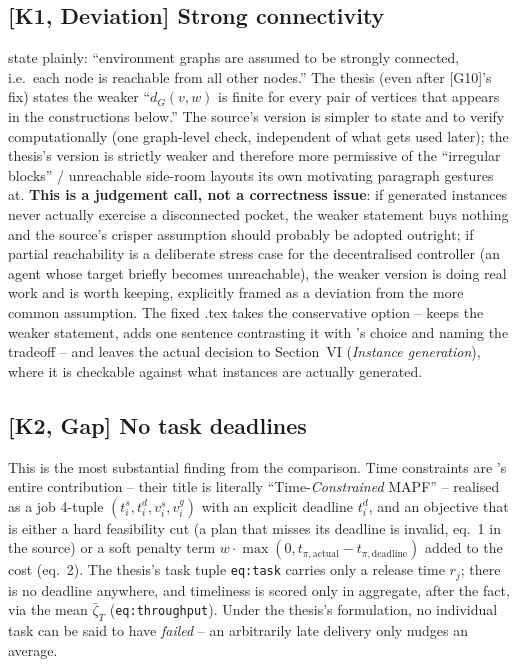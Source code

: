 \documentclass[11pt]{article}
\begin{document}
\subsection{[K1, Deviation] Strong connectivity}
\citeauthor{knippenberg2021} state plainly: ``environment graphs are assumed
to be strongly connected, i.e.\ each node is reachable from all other
nodes.'' The thesis (even after [G10]'s fix) states the weaker ``$d_G(v,w)$
is finite for every pair of vertices that appears in the constructions
below.'' The source's version is simpler to state and to verify computationally
(one graph-level check, independent of what gets used later); the thesis's
version is strictly weaker and therefore more permissive of the ``irregular
blocks'' / unreachable side-room layouts its own motivating paragraph gestures
at. \textbf{This is a judgement call, not a correctness issue}: if generated
instances never actually exercise a disconnected pocket, the weaker statement
buys nothing and the source's crisper assumption should probably be adopted
outright; if partial reachability is a deliberate stress case for the
decentralised controller (an agent whose target briefly becomes unreachable),
the weaker version is doing real work and is worth keeping, explicitly framed
as a deviation from the more common assumption. The fixed .tex takes the
conservative option -- keeps the weaker statement, adds one sentence
contrasting it with \citeauthor{knippenberg2021}'s choice and naming the
tradeoff -- and leaves the actual decision to Section~VI (\emph{Instance
generation}), where it is checkable against what instances are actually
generated.

\subsection{[K2, Gap] No task deadlines}
This is the most substantial finding from the comparison. Time constraints
are \citeauthor{knippenberg2021}'s entire contribution -- their title is
literally ``Time-\emph{Constrained} MAPF'' -- realised as a job 4-tuple
$(t_i^s, t_i^d, v_i^s, v_i^g)$ with an explicit deadline $t_i^d$, and an
objective that is either a hard feasibility cut (a plan that misses its
deadline is invalid, eq.~1 in the source) or a soft penalty term
$w\cdot\max(0, t_{\pi,\text{actual}} - t_{\pi,\text{deadline}})$ added to the
cost (eq.~2). The thesis's task tuple \texttt{eq:task} carries only a release
time $r_j$; there is no deadline anywhere, and timeliness is scored only in
aggregate, after the fact, via the mean $\bar\zeta_T$ (\texttt{eq:throughput}).
Under the thesis's formulation, no individual task can be said to have
\emph{failed} -- an arbitrarily late delivery only nudges an average.
\end{document}
